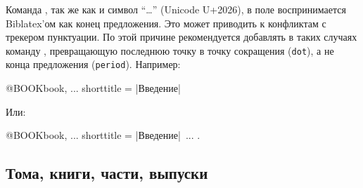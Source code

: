 \documentclass[10pt,a4paper,headings=small,numbers=enddot,english,russian]{ltxdockit}
\newcommand*{\biblatex}{Biblatex\xspace}
\newenvironment{bibexample}{\begin{list}
     {}
     {\setlength{\leftmargin}{\parindent}%
      \setlength{\itemindent}{-\leftmargin}%
      \setlength{\parsep}{0pt}}}
  {\end{list}}
\begin{document}
\begin{fieldlist}
\label{ellipsis}

Команда , так же как и символ \enquote{…} (Unicode U+2026), в поле  воспринимается \biblatex'ом
как конец предложения. Это может приводить к конфликтам с трекером пунктуации.
По этой причине рекомендуется добавлять в таких случаях
команду , превращающую
последнюю точку в точку сокращения (\texttt{dot}), а не конца предложения
(\texttt{period}). Например:

\begin{ltxcode}[escapechar=|]
@BOOK{book,
  ...
  shorttitle = {|Введение|~\textellipsis\isdot}
}
\end{ltxcode}

Или:

\begin{ltxcode}[escapechar=|]
@BOOK{book,
  ...
  shorttitle = {|Введение|~...\isdot}
}.
\end{ltxcode}

\end{fieldlist}


%
%

\subsection{Тома, книги, части, выпуски}
\label{sec:volsparts}
\end{document}
